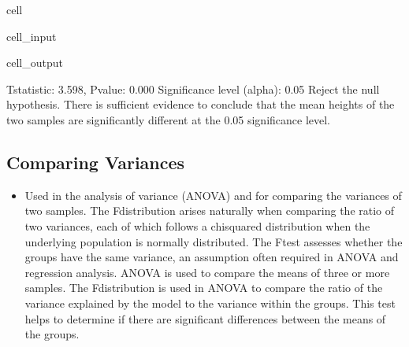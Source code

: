 \documentclass[letterpaper,10pt,english]{jupyterBook}
\begin{document}
\begin{sphinxuseclass}{cell}
\begin{sphinxVerbatimInput}
\begin{sphinxuseclass}{cell_input}
\end{sphinxuseclass}\end{sphinxVerbatimInput}
\begin{sphinxVerbatimOutput}

\begin{sphinxuseclass}{cell_output}
\begin{sphinxVerbatim}[commandchars=\\\{\}]
T\PYGZhy{}statistic: 3.598, P\PYGZhy{}value: 0.000
Significance level (alpha): 0.05
Reject the null hypothesis. There is sufficient evidence to conclude that the mean heights of the two samples are significantly different at the 0.05 significance level.
\end{sphinxVerbatim}

\noindent{}

\end{sphinxuseclass}\end{sphinxVerbatimOutput}

\end{sphinxuseclass}

\subsection{Comparing Variances}
\label{\detokenize{notebooks/review_stats:comparing-variances}}\begin{itemize}
\item {} 
\sphinxAtStartPar
{} Used in the analysis of variance (ANOVA) and for comparing the variances of two samples. The F\sphinxhyphen{}distribution arises naturally when comparing the ratio of two variances, each of which follows a chi\sphinxhyphen{}squared distribution when the underlying population is normally distributed. The F\sphinxhyphen{}test assesses whether the groups have the same variance, an assumption often required in ANOVA and regression analysis. ANOVA is used to compare the means of three or more samples. The F\sphinxhyphen{}distribution is used in ANOVA to compare the ratio of the variance explained by the model to the variance within the groups. This test helps to determine if there are significant differences between the means of the groups.

\end{itemize}
\end{document}
